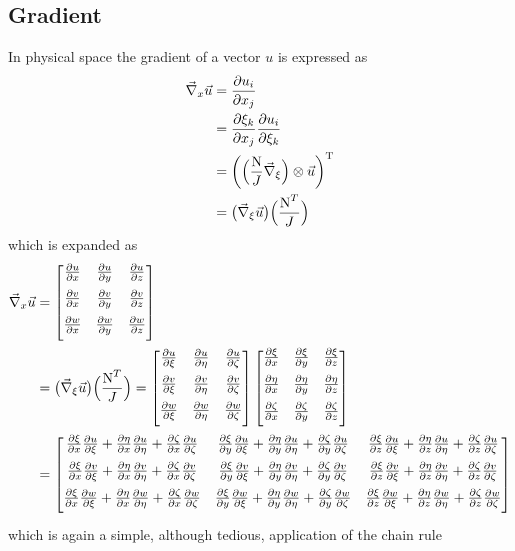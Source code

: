 \subsection{Gradient}
In physical space the gradient of a vector $u$ is expressed as
\begin{align*}
  \vecnabla_x \vec{u}
  &= \fpartial{u_i}{x_j}{1} \\
  &= \fpartial{\xi_k}{x_j}{1} \fpartial{u_i}{\xi_k}{1} \\
  &= \bigg( \Big(\NJ \vecnabla_{\xi} \Big) \otimes \vec{u}\bigg)^{\rmT} \\
  &= \big(\vecnabla_{\xi} \vec{u} \big) \Big( \NtJ \Big)
\end{align*}
which is expanded as
\begin{align*}
  \vecnabla_x \vec{u}
  &= \gradMat{u}{v}{w}{x}{y}{z} \\
  &= \big(\vecnabla_{\xi} \vec{u} \big) \Big( \NtJ \Big) = \gradXiMat{u}{v}{w}  \metric \\
  &= 
    \begin{bmatrix}
      \fpartial{\xi}{x}{1}\fpartial{u}{\xi}{1} + \fpartial{\eta}{x}{1}\fpartial{u}{\eta}{1} + \fpartial{\zeta}{x}{1}\fpartial{u}{\zeta}{1} &
      \fpartial{\xi}{y}{1}\fpartial{u}{\xi}{1} + \fpartial{\eta}{y}{1}\fpartial{u}{\eta}{1} + \fpartial{\zeta}{y}{1}\fpartial{u}{\zeta}{1} &
      \fpartial{\xi}{z}{1}\fpartial{u}{\xi}{1} + \fpartial{\eta}{z}{1}\fpartial{u}{\eta}{1} + \fpartial{\zeta}{z}{1}\fpartial{u}{\zeta}{1} \\[1.5ex]
      \fpartial{\xi}{x}{1}\fpartial{v}{\xi}{1} + \fpartial{\eta}{x}{1}\fpartial{v}{\eta}{1} + \fpartial{\zeta}{x}{1}\fpartial{v}{\zeta}{1} &
      \fpartial{\xi}{y}{1}\fpartial{v}{\xi}{1} + \fpartial{\eta}{y}{1}\fpartial{v}{\eta}{1} + \fpartial{\zeta}{y}{1}\fpartial{v}{\zeta}{1} &
      \fpartial{\xi}{z}{1}\fpartial{v}{\xi}{1} + \fpartial{\eta}{z}{1}\fpartial{v}{\eta}{1} + \fpartial{\zeta}{z}{1}\fpartial{v}{\zeta}{1} \\[1.5ex]
      \fpartial{\xi}{x}{1}\fpartial{w}{\xi}{1} + \fpartial{\eta}{x}{1}\fpartial{w}{\eta}{1} + \fpartial{\zeta}{x}{1}\fpartial{w}{\zeta}{1} &
      \fpartial{\xi}{y}{1}\fpartial{w}{\xi}{1} + \fpartial{\eta}{y}{1}\fpartial{w}{\eta}{1} + \fpartial{\zeta}{y}{1}\fpartial{w}{\zeta}{1} &
      \fpartial{\xi}{z}{1}\fpartial{w}{\xi}{1} + \fpartial{\eta}{z}{1}\fpartial{w}{\eta}{1} + \fpartial{\zeta}{z}{1}\fpartial{w}{\zeta}{1} \\[1.5ex]
    \end{bmatrix}
\end{align*}
which is again a simple, although tedious, application of the chain rule

